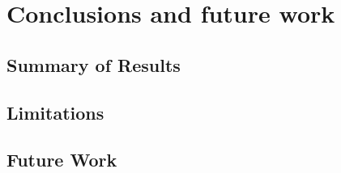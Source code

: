 \chapter[Conclusions and future work]{Conclusions and future work}
\label{chap:chap7}

\section{Summary of Results}
\section{Limitations}
\section{Future Work}
